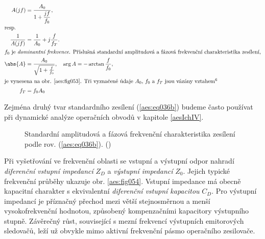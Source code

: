         \begin{subequations}\label{aes:eq036}
          \begin{align}
            A(jf)   &= \dfrac{A_0}{1 + \dfrac{jf}{f_0}},                  \label{aes:eq036a}  \\
            \shortintertext{resp.}   
            \dfrac{1}{A(jf)} &=  \dfrac{1}{A_0} + j\dfrac{f}{f_T}.        \label{aes:eq036b}  \\
            \shortintertext{\(f_0\) je \emph{dominantní frekvence}. Příslušná standardní amplitudová 
                            a fázová frekvenční charakteristika zesílení,}
            \abs{A} &= \dfrac{A_0}{\sqrt{1 + \frac{f}{f_0}}}, \quad 
                      \arg{A} = - \arctan\dfrac{f}{f_0},                  \label{aes:eq036c}  \\ 
            \shortintertext{je vynesena na obr. \ref{aes:fig053}. Tři vyznačené údaje \(A_0\), 
                            \(f_0\) a \(f_T\) jsou vázány vztahem\protect\footnotemark[6]}
            f_T &= f_0A_0                                                 \label{aes:eq036d}
          \end{align}
        \end{subequations}

        Zejména druhý tvar standardního zesílení (\ref{aes:eq036b}) budeme často používat při
        dynamické analýze operačních obvodů v kapitole \ref{aesIchIV}.

        \begin{figure}[ht!] %
          \centering
          \caption{Standardní amplitudová a fázová frekvenční charakteristika zesílení podle rov.
                  (\ref{aes:eq036b}). (\cite[s.~25]{Dostal})}
          \label{aes:fig053}
        \end{figure}  

        Při vyšetřování ve frekvenční oblasti se vstupní a výstupní odpor nahradí \emph{diferenční
        vstupní impedancí} \(Z_D\) a \emph{výstupní impedancí} \(Z_0\). Jejich typické frekvenční
        průběhy ukazuje obr. \ref{aes:fig054}. Vstupní impedance má obecně kapacitní charakter s
        ekvivalentní \emph{diferenční vstupní kapacitou} \(C_D\). Pro výstupní impedancí je
        příznačný přechod mezi větší stejnosměrnou a menší vysokofrekvenční hodnotou, způsobený
        kompenzačními kapacitory výstupního stupně. Závěrečný růst, související s mezní frekvencí
        výstupních emitorových sledovačů, leží už obvykle mimo aktivní frekvenční pásmo operačního
        zesilovače.

